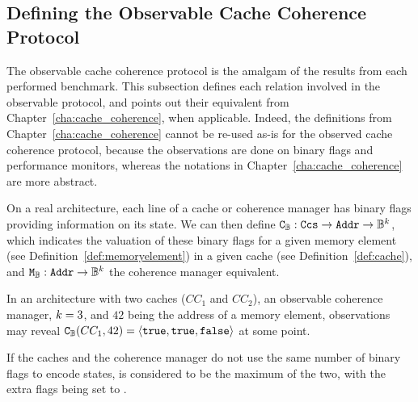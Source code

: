 \subsection{Defining the Observable Cache Coherence Protocol}
The observable cache coherence protocol is the amalgam of the results from each
performed benchmark. This subsection defines each relation involved in the
observable protocol, and points out their equivalent from
Chapter~\ref{cha:cache_coherence}, when applicable. Indeed, the definitions from
Chapter~\ref{cha:cache_coherence} cannot be re-used as-is for the observed cache
coherence protocol, because the observations are done on binary flags and
performance monitors, whereas the notations in Chapter~\ref{cha:cache_coherence}
are more abstract.

\begin{definition}
\label{def:identifying:cache_controller_state}
   On a real architecture, each line of a cache or coherence manager has
   \archboolflagscount{} binary flags providing information on its state.
   We can then define $\text{\texttt{C\textsubscript{\ensuremath{\mathbb{B}}{}}}}{}: \text{\texttt{Ccs}}{} \to
   \text{\texttt{Addr}}{} \to \mathbb{B}{}^{k}{}{}$, which indicates the valuation
   of these binary flags for a given memory element (see
   Definition~\ref{def:memoryelement}) in a given cache (see
   Definition~\ref{def:cache}), and $\text{\texttt{M\textsubscript{\ensuremath{\mathbb{B}}{}}}}{}:
   \text{\texttt{Addr}}{} \to \mathbb{B}{}^{k}{}$ the coherence manager equivalent.
\end{definition}

\begin{example}
\label{ex:identifying:first_example}
In an architecture with two caches ($CC_1$ and $CC_2$), an observable coherence
manager, $k{} = 3$, and $42$ being the address of a
memory element, observations may reveal $\text{\texttt{C\textsubscript{\ensuremath{\mathbb{B}}{}}}}{}(CC_1, 42) =
\langle \texttt{true}, \texttt{true}, \texttt{false} \rangle$ at some point.
\end{example}

If the caches and the coherence manager do not use the same number of binary
flags to encode states, \archboolflagscount{} is considered to be the maximum
of the two, with the extra flags being set to \symbfalse.

